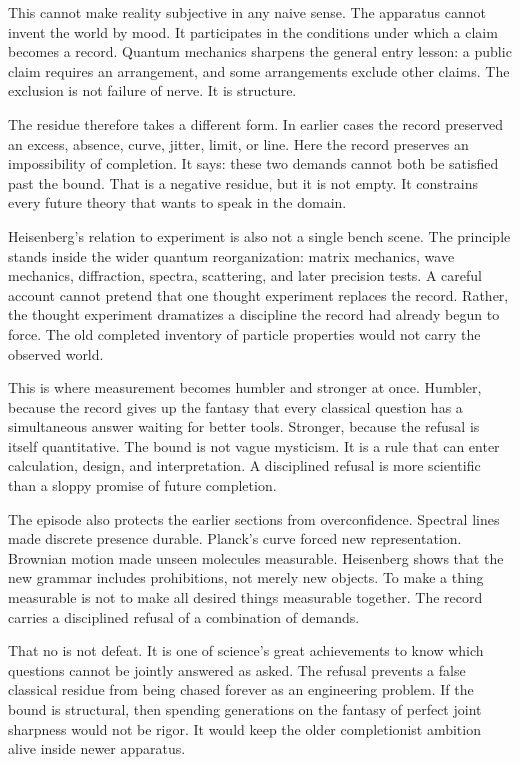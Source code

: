 This cannot make reality subjective in any naive sense. The apparatus cannot
invent the world by mood. It participates in the conditions under which a
claim becomes a record. Quantum mechanics sharpens the general entry lesson:
a public claim requires an arrangement, and some arrangements exclude other
claims. The exclusion is not failure of nerve. It is structure.

The residue therefore takes a different form. In earlier cases the record
preserved an excess, absence, curve, jitter, limit, or line. Here the record
preserves an impossibility of completion. It says: these two demands cannot
both be satisfied past the bound. That is a negative residue, but it is not
empty. It constrains every future theory that wants to speak in the domain.

Heisenberg's relation to experiment is also not a single bench scene. The
principle stands inside the wider quantum reorganization: matrix mechanics,
wave mechanics, diffraction, spectra, scattering, and later precision tests.
A careful account cannot pretend that one thought experiment replaces the
record. Rather, the thought experiment dramatizes a discipline the record had
already begun to force. The old completed inventory of particle properties
would not carry the observed world.

This is where measurement becomes humbler and stronger at once. Humbler,
because the record gives up the fantasy that every classical question has a
simultaneous answer waiting for better tools. Stronger, because the refusal is
itself quantitative. The bound is not vague mysticism. It is a rule that can
enter calculation, design, and interpretation. A disciplined refusal is more
scientific than a sloppy promise of future completion.

The episode also protects the earlier sections from overconfidence. Spectral
lines made discrete presence durable. Planck's curve forced new representation.
Brownian motion made unseen molecules measurable. Heisenberg shows that the
new grammar includes prohibitions, not merely new objects. To make a thing
measurable is not to make all desired things measurable together. The record
carries a disciplined refusal of a combination of demands.

That no is not defeat. It is one of science's great achievements to know which
questions cannot be jointly answered as asked. The refusal prevents a false
classical residue from being chased forever as an engineering problem. If the
bound is structural, then spending generations on the fantasy of perfect
joint sharpness would not be rigor. It would keep the older completionist ambition alive inside newer
apparatus.

